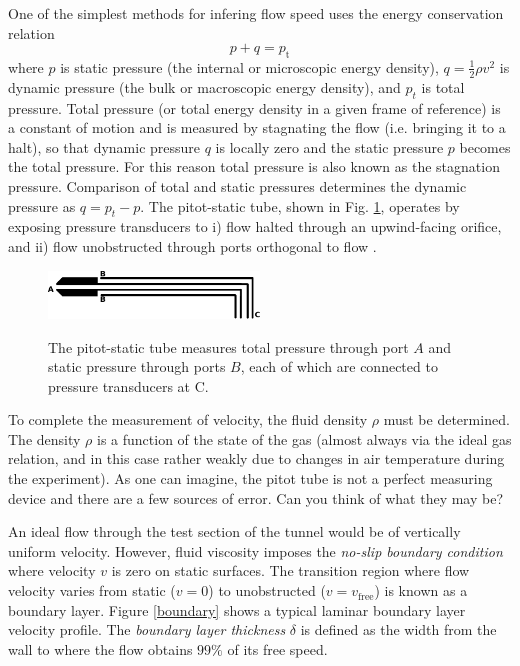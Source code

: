 \documentclass[12pt]{article}
\begin{document}
One of the simplest methods for infering flow speed uses the energy conservation relation
\begin{equation}
  p + q = p_{\text{t}}
\end{equation}
where $p$ is static pressure (the internal or microscopic energy density), $q = \frac{1}{2}\rho v^2$ is dynamic pressure (the bulk or macroscopic energy density), and $p_t$ is total pressure. Total pressure (or total energy density in a given frame of reference) is a constant of motion and is measured by stagnating the flow (i.e. bringing it to a halt), so that dynamic pressure $q$ is locally zero and the static pressure $p$ becomes the total pressure. For this reason total pressure is also known as the stagnation pressure. Comparison of total and static pressures determines the dynamic pressure as $q = p_t - p$. The pitot-static tube, shown in Fig. \ref{pitot}, operates by exposing pressure transducers to i) flow halted through an upwind-facing orifice, and ii) flow unobstructed through ports orthogonal to flow \cite{liepmann}.

\begin{figure}[h]
  \centering
  \includegraphics[width=0.5\textwidth]{pitot_static}\\
  \caption{The pitot-static tube measures total pressure through port $A$ and static pressure through ports $B$, each of which are connected to pressure transducers at C.}\label{pitot}
\end{figure}

To complete the measurement of velocity, the fluid density $\rho$ must be determined. The density $\rho$ is a function of the state of the gas (almost always via the ideal gas relation, and in this case rather weakly due to changes in air temperature during the experiment). As one can imagine, the pitot tube is not a perfect measuring device and there are a few sources of error. Can you think of what they may be?

An ideal flow through the test section of the tunnel would be of vertically uniform velocity. However, fluid viscosity imposes the \textit{no-slip boundary condition} where velocity $v$ is zero on static surfaces. The transition region where flow velocity varies from static ($v=0$) to unobstructed ($v=v_{\text{free}}$) is known as a boundary layer. Figure \ref{boundary} shows a typical laminar boundary layer velocity profile. The \textit{boundary layer thickness} $\delta$ is defined as the width from the wall to where the flow obtains $99\%$ of its free speed.
\end{document}
